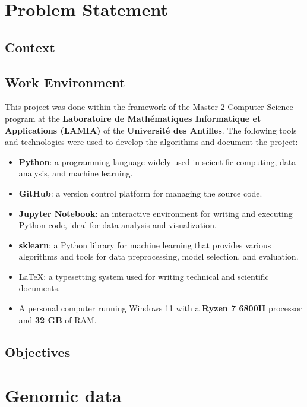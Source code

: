 \chapter{Problem Statement}
\label{chap:problem_statement}

\section{Context}
\label{sec:context}

\section{Work Environment}
\label{sec:work_environment}

This project was done within the framework of the Master 2 Computer Science program at the 
\textbf{Laboratoire de Mathématiques Informatique et Applications (LAMIA)} of the \textbf{Université des Antilles}.
The following tools and technologies were used to develop the algorithms and document the project:

\begin{itemize}
	\item \textbf{Python}: a programming language widely used in scientific computing, data analysis, and machine learning.
	\item \textbf{GitHub}: a version control platform for managing the source code.
	\item \textbf{Jupyter Notebook}: an interactive environment for writing and executing Python code, ideal for data analysis and 
	visualization.
	\item \textbf{sklearn}: a Python library for machine learning that provides various algorithms and tools for data preprocessing, 
	model selection, and evaluation.
	\item \LaTeX : a typesetting system used for writing technical and scientific documents.
	\item A personal computer running Windows 11 with a \textbf{Ryzen 7 6800H} processor and \textbf{32 GB} of RAM.
\end{itemize}

\section{Objectives}
\label{sec:objectives}

\chapter{Genomic data}
\label{chap:genomic_data}


